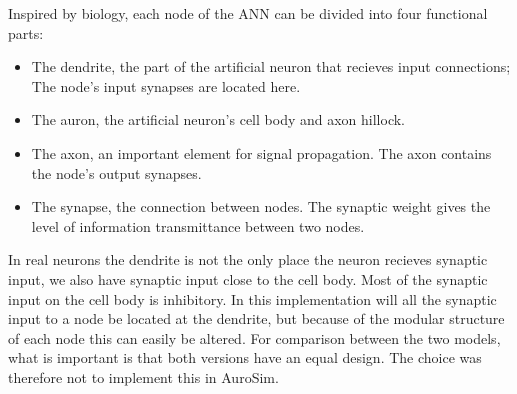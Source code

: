 
		Inspired by biology, each node of the ANN can be divided into four functional parts:
		\begin{itemize}
			\item The dendrite, the part of the artificial neuron that recieves input connections; The node's input synapses are located here.
			\item The auron, the artificial neuron's cell body and axon hillock.
			\item The axon, an important element for signal propagation. The axon contains the node's output synapses. %
			\item The synapse, the connection between nodes. The synaptic weight gives the level of information transmittance between two nodes.
		\end{itemize}
		In real neurons the dendrite is not the only place the neuron recieves synaptic input, we also have synaptic input close to the cell body.
		Most of the synaptic input on the cell body is inhibitory\cite{PrinciplesOfNeuralScience4edKAP12}.
		In this implementation will all the synaptic input to a node be located at the dendrite, but because of the modular structure of each node this can easily be altered.
		For comparison between the two models, what is important is that both versions have an equal design.
		The choice was therefore not to implement this in AuroSim.







